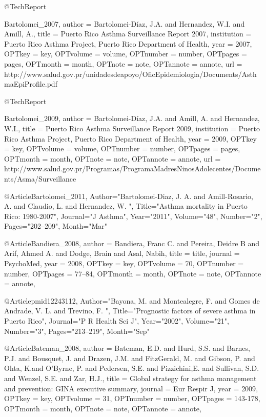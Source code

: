 @TechReport{Bartolomei_2007,
author = {Bartolomei-Díaz, J.A. and Hernandez, W.I. and Amill, A.},
title = {Puerto Rico Asthma Surveillance Report 2007},
institution = {Puerto Rico Asthma Project, Puerto Rico Department of Health},
year = {2007},
OPTkey = {key},
OPTvolume = {volume},
OPTnumber = {number},
OPTpages = {pages},
OPTmonth = {month},
OPTnote = {note},
OPTannote = {annote},
url = {http://www.salud.gov.pr/unidadesdeapoyo/OficEpidemiologia/Documents/AsthmaEpiProfile.pdf}

@TechReport{Bartolomei_2009,
author = {Bartolomei-Díaz, J.A. and Amill, A. and Hernandez, W.I.},
title = {Puerto Rico Asthma Surveillance Report 2009},
institution = {Puerto Rico Asthma Project, Puerto Rico Department of Health},
year = {2009},
OPTkey = {key},
OPTvolume = {volume},
OPTnumber = {number},
OPTpages = {pages},
OPTmonth = {month},
OPTnote = {note},
OPTannote = {annote},
url = {http://www.salud.gov.pr/Programas/ProgramaMadresNinosAdolecentes/Documents/Asma/Surveillance%
}

@Article{Bartolomei_2011,
   Author="Bartolomei-Diaz, J. A.  and Amill-Rosario, A.  and Claudio, L.  and Hernandez, W. ",
   Title="{{A}sthma mortality in {P}uerto {R}ico: 1980-2007}",
   Journal="J Asthma",
   Year="2011",
   Volume="48",
   Number="2",
   Pages="202--209",
   Month="Mar"
}


@Article{Bandiera_2008,
author = {Bandiera, Franc C. and Pereira, Deidre B and Arif, Ahmed A. and Dodge, Brain and Asal, Nabih},
title = {title},
journal = {PsychoMed},
year = {2008},
OPTkey = {key},
OPTvolume = {70},
OPTnumber = {number},
OPTpages = {77–84},
OPTmonth = {month},
OPTnote = {note},
OPTannote = {annote},
}

@Article{pmid12243112,
   Author="Bayona, M.  and Montealegre, F.  and Gomes de Andrade, V. L.  and Trevino, F. ",
   Title="{{P}rognostic factors of severe asthma in {P}uerto {R}ico}",
   Journal="P R Health Sci J",
   Year="2002",
   Volume="21",
   Number="3",
   Pages="213--219",
   Month="Sep"
}

@Article{Bateman_2008,
author = {Bateman, E.D. and Hurd, S.S.  and 
 Barnes, P.J. and Bousquet, J. and 
 Drazen, J.M. and FitzGerald, M. and 
 Gibson, P. and Ohta, K.and
 O’Byrne, P. and Pedersen, S.E. and
  Pizzichini,E. and  Sullivan, S.D. and
 Wenzel, S.E. and Zar, H.J.},
title = {Global strategy for asthma management
and prevention: GINA executive summary},
journal = {Eur Respir J},
year = {2009},
OPTkey = {key},
OPTvolume = {31},
OPTnumber = {number},
OPTpages = {143-178},
OPTmonth = {month},
OPTnote = {note},
OPTannote = {annote},
}

}}

